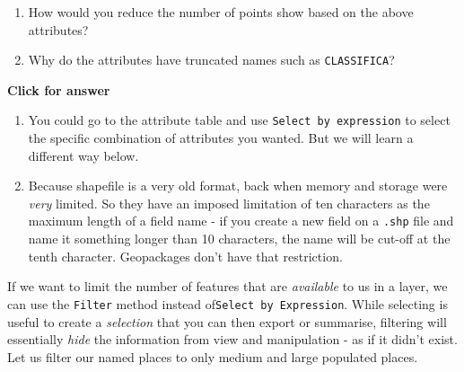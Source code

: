 \documentclass[
  letterpaper,
  DIV=11,
  numbers=noendperiod]{scrreprt}
\begin{document}
\begin{tcolorbox}[enhanced jigsaw, coltitle=black, toprule=.15mm, breakable, opacitybacktitle=0.6, left=2mm, colback=white, leftrule=.75mm, rightrule=.15mm, colbacktitle=quarto-callout-important-color!10!white, toptitle=1mm, titlerule=0mm, colframe=quarto-callout-important-color-frame, arc=.35mm, bottomtitle=1mm, opacityback=0, bottomrule=.15mm, title=\textcolor{quarto-callout-important-color}{\faExclamation}\hspace{0.5em}{Stop and Think}]

\begin{enumerate}
\def\labelenumi{\alph{enumi})}
\item
  How would you reduce the number of points show based on the above
  attributes?
\item
  Why do the attributes have truncated names such as
  \texttt{CLASSIFICA}?
\end{enumerate}

\end{tcolorbox}

\begin{tcolorbox}[enhanced jigsaw, toprule=.15mm, breakable, left=2mm, colframe=quarto-callout-important-color-frame, colback=white, arc=.35mm, leftrule=.75mm, opacityback=0, rightrule=.15mm, bottomrule=.15mm]

\vspace{-3mm}\textbf{Click for answer}\vspace{3mm}

\begin{enumerate}
\def\labelenumi{\alph{enumi})}
\item
  You could go to the attribute table and use
  \texttt{Select\ by\ expression} to select the specific combination of
  attributes you wanted. But we will learn a different way below.
\item
  Because shapefile is a very old format, back when memory and storage
  were \emph{very} limited. So they have an imposed limitation of ten
  characters as the maximum length of a field name - if you create a new
  field on a \texttt{.shp} file and name it something longer than 10
  characters, the name will be cut-off at the tenth character.
  Geopackages don't have that restriction.
\end{enumerate}

\end{tcolorbox}

If we want to limit the number of features that are \emph{available} to
us in a layer, we can use the \texttt{Filter} method instead
of\texttt{Select\ by\ Expression}. While selecting is useful to create a
\emph{selection} that you can then export or summarise, filtering will
essentially \emph{hide} the information from view and manipulation - as
if it didn't exist. Let us filter our named places to only medium and
large populated places.
\end{document}
